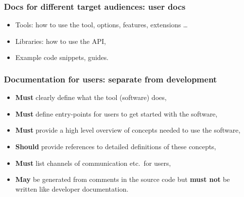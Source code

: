 \begin{frame}[c]
  \frametitle{Docs for different target audiences: user docs}
  \begin{itemize}
    \item Tools: how to \alert{use} the tool, options, features, extensions \ldots{}
    \item Libraries: how to \alert{use} the API,
    \item Example code snippets, guides.
  \end{itemize}
\end{frame}
\begin{frame}[c]
  \frametitle{Documentation for users: separate from development}
  \begin{itemize}
    \item \textbf{Must} clearly define what the tool (software) does,
    \item \textbf{Must} define \alert{entry-points} for users to get started with the software,
    \item \textbf{Must} provide a \alert{high level} overview of concepts needed to use the software,
    \item \textbf{Should} provide references to detailed definitions of these concepts,
    \item \textbf{Must} list channels of communication etc.\ for users,
      \pause{}
    \item \textbf{May} be generated from comments in the source code but \textbf{must not} be written like developer documentation.
  \end{itemize}
\end{frame}
